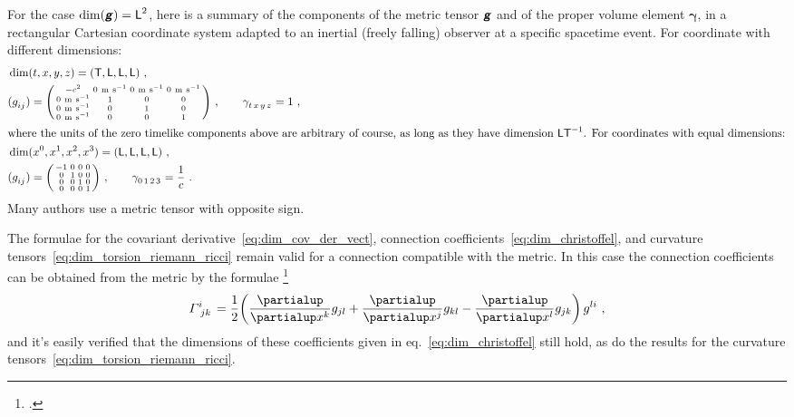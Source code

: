 \documentclass[\ifafour a4paper,12pt,\else a5paper,10pt,\fi%
onecolumn,oneside,article,%
british%
]{memoir}
\theoremstyle{remark}
\theoremstyle{innote}
\newcommand*{\mathte}[1]{\textbf{\textit{\textsf{#1}}}}
\newcommand*{\citep}{\footcites}
\newcommand*{\de}{\partialup}%
\DeclarePairedDelimiter\abs{\lvert}{\rvert}
\renewcommand*{\|}[1][]{\nonscript\,#1\vert\nonscript\;\mathopen{}}
\newcommand*{\sect}{\S}%
\newcommand*{\eqn}{eq.}%
\newcommand*{\Le}{\textsf{L}}
\newcommand*{\Ti}{\textsf{T}}
\newcommand*{\yg}{\mathte{g}}
\renewcommand*{\i}{\indices}
\newcommand*{\dex}[1][i]{\frac{\de}{\de x^{#1}}}
\newcommand*{\yGa}{\varGamma}
\newcommand*{\ye}{\bm{e}}
\newcommand*{\ygv}{\bm{\gamma}}
\begin{document}

For the case $\dim(\yg)=\Le^{2}$, here is a summary of the components of
the metric tensor $\yg$ and of the proper volume element $\ygv$, in a
rectangular Cartesian coordinate system adapted to an inertial (freely
falling) observer at a specific spacetime event. For coordinate with
different dimensions:
\begin{align}
  \label{eq:inertial_components_dimcase}
  &\begin{aligned}
    &\dim(t,x,y,z) = (\Ti,\Le,\Le,\Le) \ ,
    \\
  &(g\i{_{ij}}) =
  \begin{psmallmatrix}
    -c^{2} &0\ \mathrm{m\ s^{-1}}&0\ \mathrm{m\ s^{-1}}&0\ \mathrm{m\ s^{-1}}\\
    0\ \mathrm{m\ s^{-1}}& 1 & 0 & 0\\
    0\ \mathrm{m\ s^{-1}}& 0 & 1 & 0\\
    0\ \mathrm{m\ s^{-1}}& 0 & 0 & 1
  \end{psmallmatrix} \ ,
  \qquad
  \gamma\i{_{t\,x\,y\,z}} = 1 \ ,
  \end{aligned}
  \\
  \intertext{where the units of the zero timelike components above are arbitrary of  course, as long as they have dimension $\Le\Ti^{-1}$. For coordinates with equal dimensions:}
\label{eq:inertial_components_Lcase}
  &\begin{aligned}
    &\dim(x^{0}, x^{1}, x^{2}, x^{3}) = (\Le,\Le,\Le,\Le) \ ,
    \\
  &(g\i{_{ij}}) =
  \begin{psmallmatrix}
    -1 &0&0&0\\
    0& 1 & 0 & 0\\
    0& 0 & 1 & 0\\
    0& 0 & 0 & 1
  \end{psmallmatrix} \ ,
  \qquad
  \gamma\i{_{0\,1\,2\,3}} = \frac{1}{c} \ .
\end{aligned}
\end{align}
Many authors use a metric tensor with opposite sign.


\medskip


The formulae for the covariant derivative~\eqref{eq:dim_cov_der_vect},
connection coefficients~\eqref{eq:dim_christoffel}, and curvature
tensors~\eqref{eq:dim_torsion_riemann_ricci} remain valid for a connection
compatible with the metric. In this case the connection coefficients can be
obtained from the metric by the formulae
\citep[\sect~V.B.2]{choquetbruhatetal1977_r1996}
\begin{equation}
  \label{eq:christoffel_g}
  \yGa\i{^{i}_{jk}} = \frac{1}{2}
  \biggl(\dex[k]g_{jl} + \dex[j]g_{kl} - \dex[l]g_{jk}\biggr)\,g^{li} \ ,
\end{equation}
and it's easily verified that the dimensions of these coefficients given in
\eqn~\eqref{eq:dim_christoffel} still hold, as do the results for the
curvature tensors~\eqref{eq:dim_torsion_riemann_ricci}.
\end{document}
